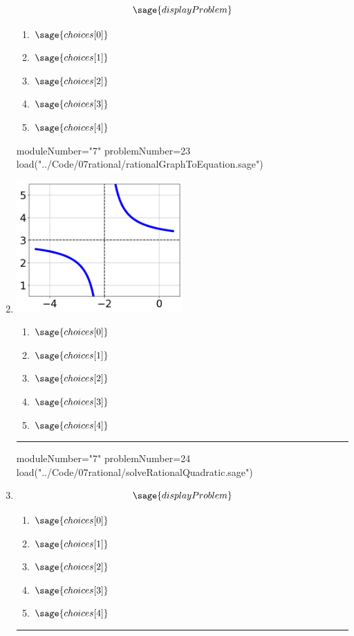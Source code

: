 \documentclass[14pt]{extbook}
\newcommand{\litem}[1]{\item#1\hspace*{-1cm}\rule{\textwidth}{0.4pt}}
\begin{document}
\begin{enumerate}
{   \[ \sage{displayProblem} \]

  	\begin{enumerate}[label=\Alph*.]
    \item \( \sage{choices[0]} \)
    \item \( \sage{choices[1]} \)
    \item \( \sage{choices[2]} \)
    \item \( \sage{choices[3]} \)
    \item \( \sage{choices[4]} \)
  	\end{enumerate}
  }

  \begin{sagesilent}
  moduleNumber="7"
  problemNumber=23
  load("../Code/07rational/rationalGraphToEquation.sage")
  \end{sagesilent}

  \litem{ 

   \begin{center}
       \includegraphics[width=0.5\textwidth]{../Figures/rationalGraphToEquationA.png}
   \end{center}

  	\begin{enumerate}[label=\Alph*.]
    \item \( \sage{choices[0]} \)
    \item \( \sage{choices[1]} \)
    \item \( \sage{choices[2]} \)
    \item \( \sage{choices[3]} \)
    \item \( \sage{choices[4]} \)
  	\end{enumerate}
  }
\begin{sagesilent}
moduleNumber="7"
problemNumber=24
load("../Code/07rational/solveRationalQuadratic.sage")
\end{sagesilent}

\litem{ 

   \[ \sage{displayProblem} \]

  	\begin{enumerate}[label=\Alph*.]
    \item \( \sage{choices[0]} \)
    \item \( \sage{choices[1]} \)
    \item \( \sage{choices[2]} \)
    \item \( \sage{choices[3]} \)
    \item \( \sage{choices[4]} \)
  	\end{enumerate}
  }

\end{enumerate}
\end{document}
